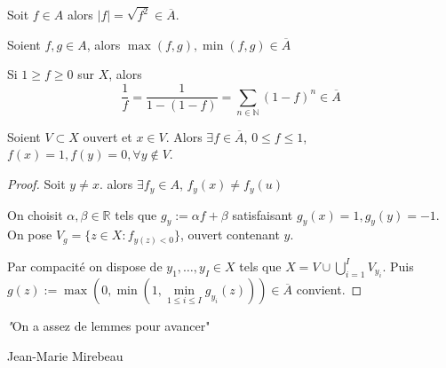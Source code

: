 \begin{corollaire}
	Soit $f \in A$ alors $|f| = \sqrt{f^2}  \in \overline{A}$.

	Soient $f,g \in A$, alors $\max\left( f,g \right), \min\left( f,g \right) \in \overline{A}$

	Si $1\ge f\ge 0$ sur $X$, alors  
 $$\frac{1}{f} = \frac{1}{1-(1-f)}= \sum_{n\in \mathbb{N}} (1-f)^n \in \overline{A}$$
\end{corollaire}
\begin{lemme}
	Soient $V\subset X$ ouvert et $x \in V$.
	Alors $\exists f \in \overline{A}$, $0\le f\le 1$, $f(x)=1, f(y) = 0, \forall y \not\in V$.
\end{lemme}
\begin{proof}
Soit $y\neq x$. alors $\exists  f_y \in A$, $f_y\left( x \right) \neq  f_{y}\left( u \right)$

On choisit $\alpha,\beta \in \mathbb{R}$ tels que $g_{y} := \alpha f + \beta $ satisfaisant $g_{y}\left( x \right) =1, g_{y}\left( y \right)=-1$.
On pose $V_g= \{z \in X : f_{y\left( z \right) <0}\} $, ouvert contenant $y$.

Par compacité on dispose de $y_1,\ldots,y_I \in X$ tels que $X = V \cup \bigcup_{i=1} ^I V_{y_i}$. Puis $g\left( z \right)  := \max\left( 0, \min\left( 1, \min \limits_{1\le i\le I} g_{y_i}\left( z \right)  \right)  \right) \in \overline{A}$ convient.
\end{proof}
\epigraph{\textit "On a assez de lemmes pour avancer"}{Jean-Marie Mirebeau}

